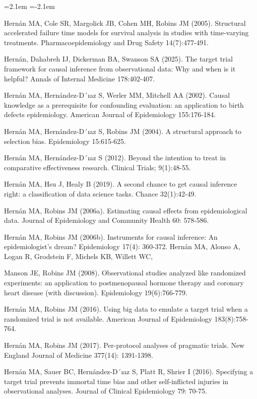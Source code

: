 \begin{list}{}{\leftmargin=2.1em   \itemindent=-2.1em \parsep=0pt \itemsep=1.6pt \topsep=4pt \rightmargin=0pt}
\item Hernán MA, Cole SR, Margolick JB, Cohen MH, Robins JM (2005). Structural accelerated failure time models for survival analysis in studies with time-varying treatments. Pharmacoepidemiology and Drug Safety 14(7):477-491.
\item Hernán, Dahabreh IJ, Dickerman BA, Swanson SA (2025). The target trial framework for causal inference from observational data: Why and when is it helpful? Annals of Internal Medicine 178:402-407.
\item Hernán MA, Hernández-D´ıaz S, Werler MM, Mitchell AA (2002). Causal knowledge as a prerequisite for confounding evaluation: an application to birth defects epidemiology. American Journal of Epidemiology 155:176-184.
\item Hernán MA, Hernández-D´ıaz S, Robins JM (2004). A structural approach to selection bias. Epidemiology 15:615-625.
\item Hernán MA, Hernández-D´ıaz S (2012). Beyond the intention to treat in comparative effectiveness research. Clinical Trials; 9(1):48-55.
\item Hernán MA, Hsu J, Healy B (2019). A second chance to get causal inference right: a classification of data science tasks. Chance 32(1):42-49.
\item Hernán MA, Robins JM (2006a). Estimating causal effects from epidemiological data. Journal of Epidemiology and Community Health 60: 578-586.
\item Hernán MA, Robins JM (2006b). Instruments for causal inference: An epidemiologist's dream? Epidemiology 17(4): 360-372. Hernán MA, Alonso A, Logan R, Grodstein F, Michels KB, Willett WC,
\item Manson JE, Robins JM (2008). Observational studies analyzed like randomized experiments: an application to postmenopausal hormone therapy and coronary heart disease (with discussion). Epidemiology 19(6):766-779.
\item Hernán MA, Robins JM (2016). Using big data to emulate a target trial when a randomized trial is not available. American Journal of Epidemiology 183(8):758-764.
\item Hernán MA, Robins JM (2017). Per-protocol analyses of pragmatic trials. New England Journal of Medicine 377(14): 1391-1398.
\item Hernán MA, Sauer BC, Hernández-D´ıaz S, Platt R, Shrier I (2016). Specifying a target trial prevents immortal time bias and other self-inflicted injuries in observational analyses. Journal of Clinical Epidemiology 79: 70-75.

\end{list}
